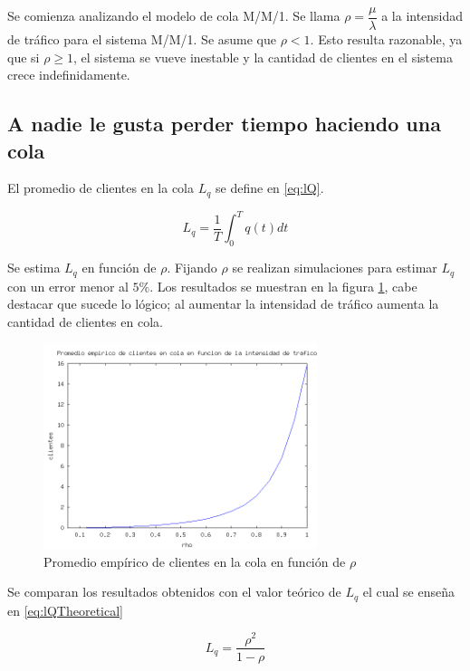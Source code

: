\documentclass{sig-alternate}
\begin{document}
Se comienza analizando el modelo de cola M/M/1.
Se llama $\rho = \dfrac{\mu}{\lambda}$ a la intensidad de tr\'afico para el sistema M/M/1.
Se asume que $\rho < 1$. Esto resulta razonable, ya que si $\rho \geq 1$, el sistema se vueve inestable y la cantidad
de clientes en el sistema crece indefinidamente.

\subsection{A nadie le gusta perder tiempo haciendo una cola}
\label{sec:parte1}
El promedio de clientes en la cola $L_q$ se define en \eqref{eq:lQ}.

\begin{equation}
\label{eq:lQ}
L_q = \dfrac{1}{T} \int_{0}^{T} q(t) dt
\end{equation}

Se estima $L_q$ en funci\'on de $\rho$. Fijando $\rho$ se realizan simulaciones para estimar $L_q$
con un error menor al $5\%$. Los resultados se muestran en la figura \ref{fig:meanQueue}, cabe destacar
que sucede lo l\'ogico; al aumentar la intensidad de tr\'afico aumenta la cantidad de clientes en cola.\\

\begin{figure}[ht]
\begin{center}
\includegraphics[width=8cm]{queueEmpiricVSrho}
\caption{\label{fig:meanQueue} Promedio emp\'irico de clientes en la cola en funci\'on de $\rho$}
\end{center}
\end{figure}

Se comparan los resultados obtenidos con el valor te\'orico de $L_q$ el cual se ense\~na en \eqref{eq:lQTheoretical}



\begin{equation}
\label{eq:lQTheoretical}
L_q = \dfrac{\rho^{2}}{1 - \rho}
\end{equation}
\end{document}
